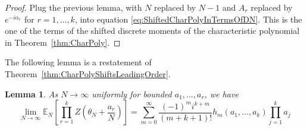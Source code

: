 \documentclass[12pt,a4paper,reqno]{amsart}
\newtheorem{lemma}{Lemma}
\theoremstyle{remark}
\numberwithin{equation}{section}
\newcommand{\E}{\mathbb{E}}
\begin{document}
\begin{proof}
Plug the previous lemma, with $N$ replaced by $N-1$ and $A_r$ replaced by $e^{-i\alpha_r}$ for $r=1,\dots,k$, into equation \eqref{eq:ShiftedCharPolyInTermsOfDN}. This is the one of the terms of the shifted discrete moments of the characteristic polynomial in Theorem~\ref{thm:CharPoly}.
\end{proof}

The following lemma is a restatement of Theorem~\ref{thm:CharPolyShiftsLeadingOrder}.
\begin{lemma}
As $N \to \infty$ uniformly for bounded $a_1,\dots,a_r$, we have
\begin{equation}\label{eq:CharPolyShiftedAsympt}
\lim_{N \to \infty} \E_N\left[ \prod_{r=1}^k Z\left(\theta_N+\frac{a_r}{N}\right) \right]
=   \sum_{m=0}^\infty \frac{(-1)^{m} i^{k+m}}{(m+k+1)!} h_{m}(a_1,\dots,a_k)   \prod_{j=1}^k a_j
\end{equation}
\end{lemma}
\end{document}
